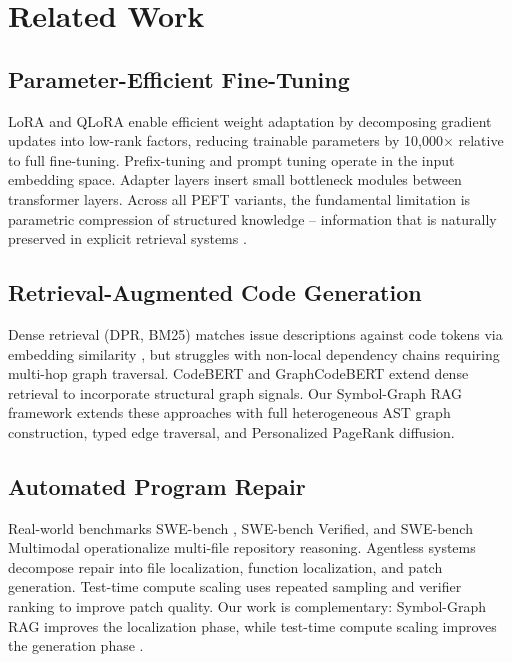 \documentclass[10pt,journal,compsoc,twocolumn]{IEEEtran}
\begin{document}
\section{Related Work}



\subsection{Parameter-Efficient Fine-Tuning}


LoRA \cite{crossref_10_48550_arxiv_2106_09685} and QLoRA \cite{crossref_10_48550_arxiv_2305_14314} enable efficient weight adaptation by decomposing gradient updates into low-rank factors, reducing trainable parameters by 10,000$\times$ relative to full fine-tuning. Prefix-tuning \cite{arxiv_2101_00190} and prompt tuning operate in the input embedding space. Adapter layers insert small bottleneck modules between transformer layers. Across all PEFT variants, the fundamental limitation is parametric compression of structured knowledge -- information that is naturally preserved in explicit retrieval systems \cite{arxiv_2101_00190}.


\subsection{Retrieval-Augmented Code Generation}


Dense retrieval (DPR, BM25) matches issue descriptions against code tokens via embedding similarity \cite{arxiv_2501_02842}, but struggles with non-local dependency chains requiring multi-hop graph traversal. CodeBERT \cite{arxiv_2002_08155} and GraphCodeBERT extend dense retrieval to incorporate structural graph signals. Our Symbol-Graph RAG framework extends these approaches with full heterogeneous AST graph construction, typed edge traversal, and Personalized PageRank diffusion.


\subsection{Automated Program Repair}


Real-world benchmarks SWE-bench \cite{arxiv_2505_23419}, SWE-bench Verified, and SWE-bench Multimodal operationalize multi-file repository reasoning. Agentless systems decompose repair into file localization, function localization, and patch generation. Test-time compute scaling uses repeated sampling and verifier ranking to improve patch quality. Our work is complementary: Symbol-Graph RAG improves the localization phase, while test-time compute scaling improves the generation phase \cite{arxiv_2412_06333}.
\end{document}

